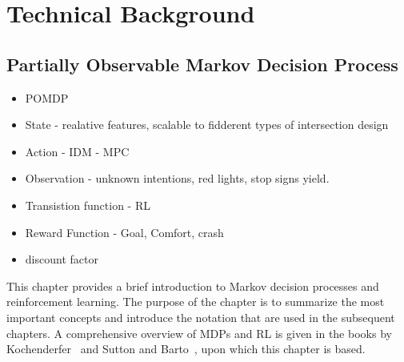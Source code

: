 \chapter{Technical Background}\label{chapter:background}
%

\section{Partially Observable Markov Decision Process}\label{section:pomdp}

\begin{itemize}
    \item POMDP
    \item State - realative features, scalable to fidderent types of intersection design 
    \item Action - IDM - MPC
    \item Observation - unknown intentions, red lights, stop signs yield. 
    \item Transistion function - RL 
    \item Reward Function - Goal, Comfort, crash
    \item discount factor 
\end{itemize}



This chapter provides a brief introduction to Markov decision processes and reinforcement learning.
The purpose of the chapter is to summarize the most important concepts and introduce the notation that are used in the subsequent chapters. 
A comprehensive overview of MDPs and RL is given in the books by Kochenderfer~\cite{Kochenderfer2015} and Sutton and Barto~\cite{Sutton2018}, upon which this chapter is based.


